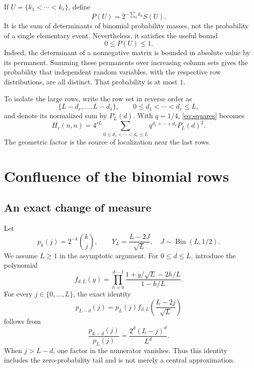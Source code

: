 \documentclass[11pt]{article}
\numberwithin{equation}{section}
\theoremstyle{definition}
\newcommand{\fall}[2]{#1^{\underline{#2}}}
\begin{document}
If $U=\{k_1<\cdots<k_r\}$, define
\begin{equation}\label{eq:Pdef}
 P(U)=2^{-\sum_a k_a}S(U).
\end{equation}
It is the sum of determinants of binomial probability masses, not the probability of a single elementary event. Nevertheless, it satisfies the useful bound
\begin{equation}\label{eq:Pbound}
 0\leq P(U)\leq1.
\end{equation}
Indeed, the determinant of a nonnegative matrix is bounded in absolute value by its permanent. Summing these permanents over increasing column sets gives the probability that independent random variables, with the respective row distributions, are all distinct. That probability is at most $1$.

To isolate the large rows, write the row set in reverse order as
\[
 \{L-d_r,\ldots,L-d_1\},\qquad 0\leq d_1<\cdots<d_r\leq L,
\]
and denote its normalized sum by $P_L(d)$. With $q=1/4$, \eqref{eq:squares} becomes
\begin{equation}\label{eq:localized-exact}
 H_r(n,n)=4^{rL}
 \sum_{0\leq d_1<\cdots<d_r\leq L}q^{d_1+\cdots+d_r}P_L(d)^2.
\end{equation}
The geometric factor is the source of localization near the last rows.

\section{Confluence of the binomial rows}\label{sec:confluence}

\subsection{An exact change of measure}
Let
\[
 p_k(j)=2^{-k}\binom{k}{j},\qquad
 Y_L=\frac{L-2J}{\sqrt L},\quad J\sim\operatorname{Bin}(L,1/2).
\]
We assume $L\geq1$ in the asymptotic argument. For $0\leq d\leq L$, introduce the polynomial
\begin{equation}\label{eq:fpoly}
 f_{d,L}(y)=\prod_{h=0}^{d-1}\frac{1+y/\sqrt L-2h/L}{1-h/L}.
\end{equation}
For every $j\in\{0,\ldots,L\}$, the exact identity
\begin{equation}\label{eq:likelihood}
 p_{L-d}(j)=p_L(j)f_{d,L}\!\left(\frac{L-2j}{\sqrt L}\right)
\end{equation}
follows from
\[
 \frac{p_{L-d}(j)}{p_L(j)}
 =\frac{2^d\fall{(L-j)}{d}}{\fall Ld}.
\]
When $j>L-d$, one factor in the numerator vanishes. Thus this identity includes the zero-probability tail and is not merely a central approximation.
\end{document}
